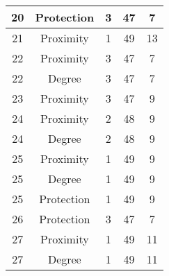 \documentclass[results.tex]{subfiles}
\begin{document}
\begin{center}
\begin{tabular}{| c || c | c | c | c |}
            \hline
            20                      & Protection                   & 3                      & 47                      & 7                    \\
            \hline
            21                      & Proximity                    & 1                      & 49                      & 13                   \\
            \hline
            22                      & Proximity                    & 3                      & 47                      & 7                    \\
            \hline
            22                      & Degree                       & 3                      & 47                      & 7                    \\
            \hline
            23                      & Proximity                    & 3                      & 47                      & 9                    \\
            \hline
            24                      & Proximity                    & 2                      & 48                      & 9                    \\
            \hline
            24                      & Degree                       & 2                      & 48                      & 9                    \\
            \hline
            25                      & Proximity                    & 1                      & 49                      & 9                    \\
            \hline
            25                      & Degree                       & 1                      & 49                      & 9                    \\
            \hline
            25                      & Protection                   & 1                      & 49                      & 9                    \\
            \hline
            26                      & Protection                   & 3                      & 47                      & 7                    \\
            \hline
            27                      & Proximity                    & 1                      & 49                      & 11                   \\
            \hline
            27                      & Degree                       & 1                      & 49                      & 11                   \\

\end{tabular}
\end{center}
\end{document}
